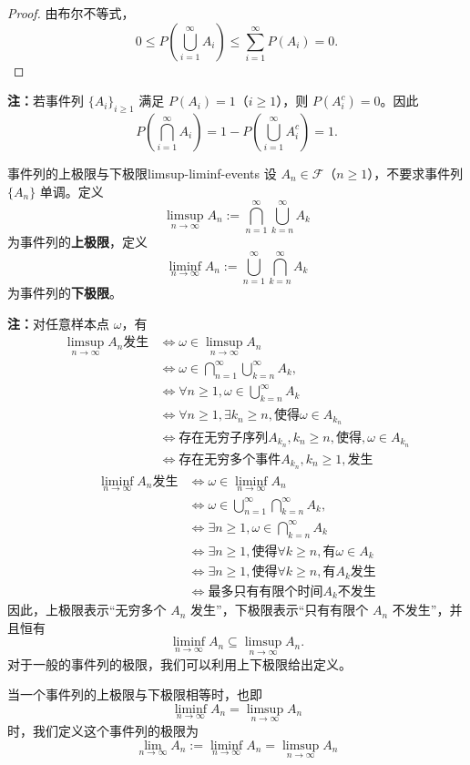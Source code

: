 \begin{proof}
由布尔不等式，
\[
0\leq P\left(\bigcup_{i=1}^{\infty}A_i\right)
\leq\sum_{i=1}^{\infty}P(A_i)=0.
\]
\end{proof}

\textbf{注：}若事件列 $\{A_i\}_{i\geq1}$ 满足 $P(A_i)=1$（$i\geq1$），则 $P(A_i^c)=0$。因此
\[
P\left(\bigcap_{i=1}^{\infty}A_i\right)
=1-P\left(\bigcup_{i=1}^{\infty}A_i^c\right)=1.
\]

\begin{mydefinition}{事件列的上极限与下极限}{limsup-liminf-events}
设 $A_n\in\mathscr{F}$（$n\geq1$），不要求事件列 $\{A_n\}$ 单调。定义
\[
\limsup_{n\to\infty}A_n
:=\bigcap_{n=1}^{\infty}\bigcup_{k=n}^{\infty}A_k
\]
为事件列的\textbf{上极限}，定义
\[
\liminf_{n\to\infty}A_n
:=\bigcup_{n=1}^{\infty}\bigcap_{k=n}^{\infty}A_k
\]
为事件列的\textbf{下极限}。
\end{mydefinition}

\textbf{注：}对任意样本点 $\omega$，有
\[
\begin{aligned}
\limsup_{n\to\infty}A_n\text{发生}&\iff\omega\in\limsup_{n\to\infty}A_n\\&\iff \omega\in \bigcap_{n=1}^{\infty}\bigcup_{k=n}^{\infty}A_k,\\
&\iff \forall n\geqslant 1,\omega \in \bigcup_{k=n}^{\infty}A_k\\&\iff \forall n\geqslant 1,\exists k_n\geqslant n ,\text{使得}\omega\in A_{k_n}\\
&\iff \text{存在无穷子序列}A_{k_n}, k_n\geqslant n,\text{使得},\omega \in A_{k_n}\\
& \iff \text{存在无穷多个事件}A_{k_n},k_n\geqslant 1,\text{发生}
\end{aligned}
\]
\[
\begin{aligned}
	\liminf_{n\to\infty}A_n\text{发生}&\iff\omega\in\liminf_{n\to\infty}A_n\\&\iff \omega\in \bigcup_{n=1}^{\infty}\bigcap_{k=n}^{\infty}A_k,\\
	&\iff \exists n\geqslant 1,\omega \in \bigcap_{k=n}^{\infty}A_k\\&\iff \exists n\geqslant 1,\text{使得}\forall k\geqslant n ,\text{有}\omega\in A_{k}\\
	&\iff\exists n\geqslant 1,\text{使得}\forall k\geqslant n ,\text{有}A_{k}\text{发生}\\
	& \iff \text{最多只有有限个时间}A_k\text{不发生}
\end{aligned}
\]
因此，上极限表示“无穷多个 $A_n$ 发生”，下极限表示“只有有限个 $A_n$ 不发生”，并且恒有
\[
\liminf_{n\to\infty}A_n\subseteq\limsup_{n\to\infty}A_n.
\]
对于一般的事件列的极限，我们可以利用上下极限给出定义。
\begin{mydefinition}
	当一个事件列的上极限与下极限相等时，也即
	\[\liminf_{n\to\infty}A_n =\limsup_{n\to\infty}A_n\]
	时，我们定义这个事件列的极限为
	\[\lim\limits_{n\to\infty}A_n :=\liminf_{n\to\infty}A_n =\limsup_{n\to\infty}A_n\]
\end{mydefinition}
